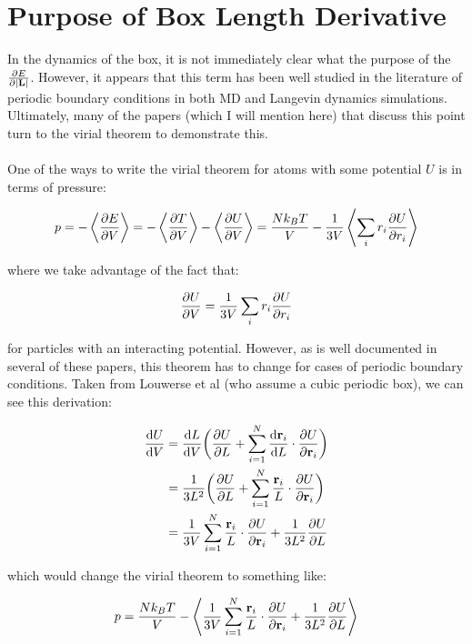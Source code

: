\documentclass[12pt]{article}
\begin{document}
\section{Purpose of Box Length Derivative}
In the dynamics of the box, it is not immediately clear what the purpose of the $\pdv{E}{|\vb{L}|}$. However, it appears that this term has been well studied in the literature of periodic boundary conditions in both MD and Langevin dynamics simulations. Ultimately, many of the papers (which I will mention here) that discuss this point turn to the virial theorem to demonstrate this. \\ \\
One of the ways to write the virial theorem for atoms with some potential $U$ is in terms of pressure:
\begin{center}
\begin{equation}
\label{eqn: virial}
p = -\expval{\pdv{E}{V}} = -\expval{\pdv{T}{V}} - \expval{\pdv{U}{V}} = \frac{N k_B T}{V} - \frac{1}{3 V} \expval{\sum\limits_i r_i \pdv{U}{r_i}}
\end{equation}
\end{center} 
where we take advantage of the fact that:
\begin{center}
\begin{equation}
\label{eqn: dudv}
\pdv{U}{V} = \frac{1}{3 V} \sum\limits_i r_i \pdv{U}{r_i}
\end{equation}
\end{center}
for particles with an interacting potential. However, as is well documented in several of these papers, this theorem has to change for cases of periodic boundary conditions. Taken from Louwerse et al (who assume a cubic periodic box), we can see this derivation:
\begin{center}
\begin{equation}
\begin{split}
\dv{U}{V} &= \dv{L}{V} \bigg(\pdv{U}{L} +\sum_{i=1}^{N}\dv{\vb{r}_i}{L} \cdot \pdv{U}{\vb{r}_i} \bigg)\\
&= \frac{1}{3 L^2} \bigg(\pdv{U}{L} +\sum_{i=1}^{N}\frac{\vb{r}_i}{L} \cdot \pdv{U}{\vb{r}_i}\bigg)\\
&= \frac{1}{3V} \sum_{i=1}^{N}\frac{\vb{r}_i}{L} \cdot \pdv{U}{\vb{r}_i} + \frac{1}{3 L^2} \pdv{U}{L}
\end{split}
\end{equation}
\end{center}
which would change the virial theorem to something like:
\begin{center}
\begin{equation}
\label{eqn: virialedit}
p = \frac{N k_B T}{V} - \expval{\frac{1}{3V} \sum_{i=1}^{N}\frac{\vb{r}_i}{L} \cdot \pdv{U}{\vb{r}_i} + \frac{1}{3 L^2} \pdv{U}{L}}
\end{equation}
\end{center}
\end{document}
